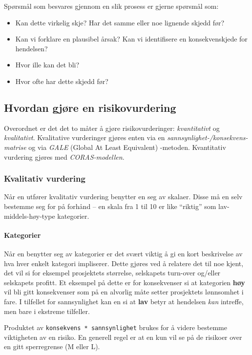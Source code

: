 Spørsmål som besvares gjennom en slik prosess er gjerne spørsmål som:

\begin{itemize}
\item
  Kan dette virkelig skje? Har det samme eller noe lignende skjedd før?
\item
  Kan vi forklare en plausibel årsak? Kan vi identifisere en
  konsekvenskjede for hendelsen?
\item
  Hvor ille kan det bli?
\item
  Hvor ofte har dette skjedd før?
\end{itemize}
\subsection{Hvordan gjøre en risikovurdering}

Overordnet er det det to måter å gjøre risikovurderinger:
\emph{kvantitativt} og \emph{kvalitativt}. Kvalitative vurderinger
gjøres enten via en \emph{sannsynlighet-/konsekvens-matrise} og via
\emph{GALE} (Global At Least Equivalent) -metoden. Kvantitativ vurdering
gjøres med \emph{CORAS-modellen}.

\subsubsection{Kvalitativ vurdering}

Når en utfører kvalitativ vurdering benytter en seg av skalaer. Disse må
en selv bestemme seg for på forhånd -- en skala fra 1 til 10 er like
``riktig'' som lav-middels-høy-type kategorier.

\paragraph{Kategorier}

Når en benytter seg av kategorier er det svært viktig å gi en kort
beskrivelse av hva hver enkelt kategori impliserer. Dette gjøres ved å
relatere det til noe kjent, det vil si for eksempel prosjektets
størrelse, selskapets turn-over og/eller selskapets profitt. Et eksempel
på dette er for konsekvenser si at kategorien \textbf{høy} vil bli gitt
konsekvenser som på en alvorlig måte setter prosjektets lønnsomhet i
fare. I tilfellet for sannsynlighet kan en si at \textbf{lav} betyr at
hendelsen \emph{kan} intreffe, men bare i ekstreme tilfeller.

Produktet av \texttt{konsekvens * sannsynlighet} brukes for å videre
bestemme viktigheten av en risiko. En generell regel er at en kun vil se
på de risikoer over en gitt sperregrense (M eller L).

